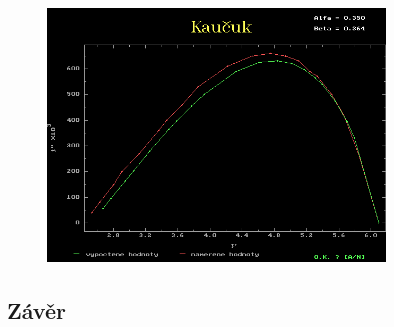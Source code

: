 \documentclass{article}
\begin{document}
\begin{figure}[H]
    \begin{minipage}[t]{\textwidth}
        \centering
        \includegraphics[width=0.8\textwidth]{obrazky/kaucuk_vypoctene.png}
    \end{minipage}
\end{figure}


\subsection*{Závěr}
\end{document}
